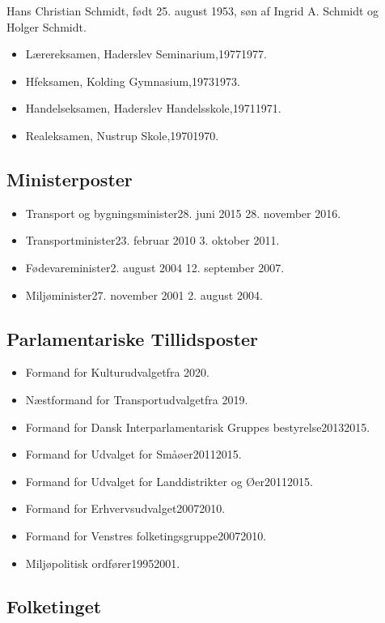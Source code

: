 \documentclass[11pt, a4paper]{awesome-cv}
\begin{document}
\makecvheader[R]
\makelettertitle
\begin{cvletter}
Hans Christian Schmidt, født 25. august 1953, søn af Ingrid A. Schmidt og Holger Schmidt.

\begin{itemize}
\item Lærereksamen, Haderslev Seminarium,19771977.
\item Hfeksamen, Kolding Gymnasium,19731973.
\item Handelseksamen, Haderslev Handelsskole,19711971.
\item Realeksamen, Nustrup Skole,19701970.
\end{itemize}
\subsection*{Ministerposter}
\begin{itemize}
\item Transport og bygningsminister28. juni 2015  28. november 2016.
\item Transportminister23. februar 2010  3. oktober 2011.
\item Fødevareminister2. august 2004  12. september 2007.
\item Miljøminister27. november 2001  2. august 2004.
\end{itemize}
\subsection*{Parlamentariske Tillidsposter}
\begin{itemize}
\item Formand for Kulturudvalgetfra 2020.
\item Næstformand for Transportudvalgetfra 2019.
\item Formand for Dansk Interparlamentarisk Gruppes bestyrelse20132015.
\item Formand for Udvalget for Småøer20112015.
\item Formand for Udvalget for Landdistrikter og Øer20112015.
\item Formand for Erhvervsudvalget20072010.
\item Formand for Venstres folketingsgruppe20072010.
\item Miljøpolitisk ordfører19952001.
\end{itemize}
\subsection*{Folketinget}

\end{cvletter}
\end{document}
